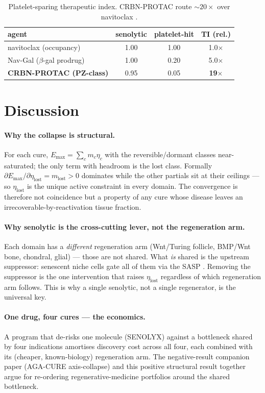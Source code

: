 \documentclass[11pt,a4paper]{article}
\begin{document}
\begin{table}[h]\centering\small
\begin{tabular}{lccc}
\toprule
\textbf{agent} & \textbf{senolytic} & \textbf{platelet-hit} & \textbf{TI (rel.)} \\
\midrule
navitoclax (occupancy) & 1.00 & 1.00 & 1.0$\times$ \\
Nav-Gal ($\beta$-gal prodrug) & 1.00 & 0.20 & 5.0$\times$ \\
\textbf{CRBN-PROTAC (PZ-class)} & 0.95 & 0.05 & \textbf{19$\times$} \\
\bottomrule
\end{tabular}
\caption{Platelet-sparing therapeutic index. CRBN-PROTAC route $\sim 20\times$ over
navitoclax \citep{he2020}.}
\label{tab:ti}
\end{table}

\section{Discussion}
\label{sec:discussion}
\paragraph{Why the collapse is structural.} For each cure, $E_{\max}=\sum_c m_c\eta_c$ with
the reversible/dormant classes near-saturated; the only term with headroom is the lost class.
Formally $\partial E_{\max}/\partial\eta_{\text{lost}}=m_{\text{lost}}>0$ dominates while the
other partials sit at their ceilings --- so $\eta_{\text{lost}}$ is the unique active
constraint in every domain. The convergence is therefore not coincidence but a property of
any cure whose disease leaves an irrecoverable-by-reactivation tissue fraction.
\paragraph{Why senolytic is the cross-cutting lever, not the regeneration arm.} Each domain
has a \emph{different} regeneration arm (Wnt/Turing follicle, BMP/Wnt bone, chondral, glial)
--- those are not shared. What \emph{is} shared is the upstream suppressor: senescent niche
cells gate all of them via the SASP \citep{moiseeva2023}. Removing the suppressor is the one
intervention that raises $\eta_{\text{lost}}$ regardless of which regeneration arm follows.
This is why a single senolytic, not a single regenerator, is the universal key.
\paragraph{One drug, four cures --- the economics.} A program that de-risks one molecule
(SENOLYX) against a bottleneck shared by four indications amortises discovery cost across all
four, each combined with its (cheaper, known-biology) regeneration arm. The negative-result
companion paper (AGA-CURE axis-collapse) and this positive structural result together argue
for re-ordering regenerative-medicine portfolios around the shared bottleneck.
\end{document}
